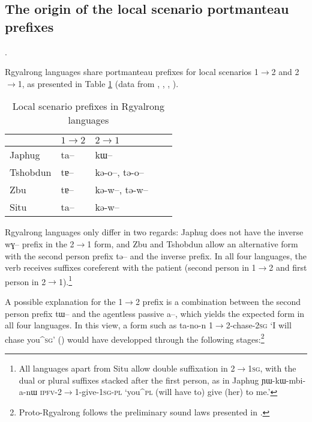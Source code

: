 \documentclass[oldfontcommands,oneside,a4paper,11pt]{article}
\newcommand{\ipa}[1]{{\phon \mbox{#1}}} %
\begin{document}


\subsection{The origin of the local scenario portmanteau prefixes}
.

Rgyalrong languages share portmanteau prefixes for local scenarios 1$\rightarrow$2 and 2$\rightarrow$1, as presented in Table \ref{tab:local.rgy} (data from \citealt[218]{linxr93jiarong}, \citealt{jackson02rentongdengdi}, \citealt{jacques12agreement}, \citealt{gongxun14agreement}).

\begin{table}
\caption{Local scenario prefixes in Rgyalrong languages} \centering \label{tab:local.rgy} 
\begin{tabular}{lllll}
\toprule
& $1\rightarrow2$ & $2\rightarrow1$ \\
\midrule
Japhug &  \ipa{ta--} & \ipa{kɯ--} \\
Tshobdun &  \ipa{tɐ--} & \ipa{kə-o--}, \ipa{tə-o--} \\
Zbu &  \ipa{tɐ--} &\ipa{kə-w--}, \ipa{tə-w--} \\
Situ &  \ipa{ta--} & \ipa{kə-w--} \\
\bottomrule
\end{tabular}
\end{table}

Rgyalrong languages only differ in two regards: Japhug does not have the inverse \ipa{wɣ--} prefix in the  2$\rightarrow$1 form, and Zbu and Tshobdun allow an alternative form with the second person prefix \ipa{tə--} and the inverse prefix. In all four languages, the verb receives suffixes coreferent with the patient (second person in 1$\rightarrow$2 and first person in  2$\rightarrow$1).\footnote{All languages apart from Situ allow double suffixation in 2$\rightarrow$\textsc{1sg}, with the dual or plural suffixes stacked after the first person, as in Japhug \ipa{ɲɯ-kɯ-mbi-a-nɯ} \textsc{ipfv}-2$\rightarrow$1-give-\textsc{1sg-pl} `you^{\textsc{pl}} (will have to) give (her) to me.'}

A possible explanation for the 1$\rightarrow$2  prefix is a combination between the second person prefix \ipa{tɯ--} and the agentless passive \ipa{a--}, which yields the expected form in all four languages. In this view, a form such as \ipa{ta-no-n} 1$\rightarrow$2-chase-\textsc{2sg} `I will chase you^{\textsc{sg}}' (\citealt[219]{linxr93jiarong}) would have developped through the following stages:\footnote{Proto-Rgyalrong follows the preliminary sound laws presented in \citet{jacques04these}.}
\end{document}
